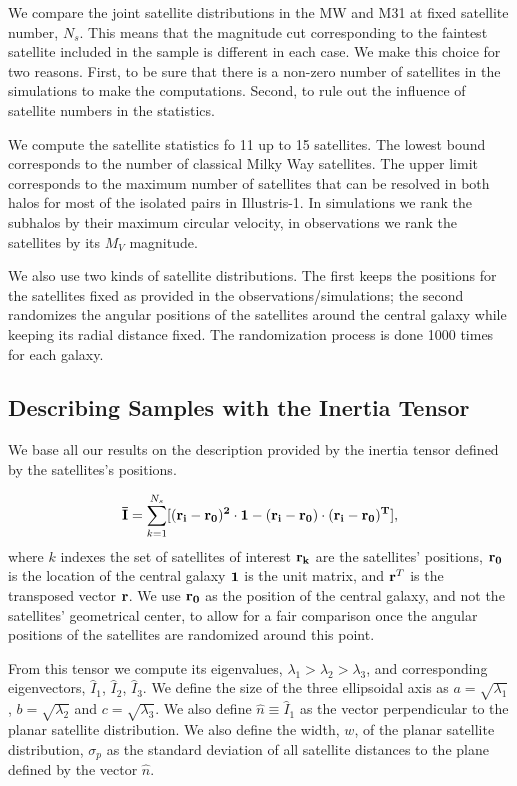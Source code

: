 \documentclass[a4paper,fleqn,usenatbib]{mnras}
\begin{document}
We compare the joint satellite distributions in the MW and M31 at fixed
satellite number, $N_s$.
This means that the magnitude cut corresponding to the faintest
satellite included in the sample is different in each case.
We make this choice for two reasons. 
First, to be sure that there is a non-zero number of satellites in the
simulations to make the computations.  
Second, to rule out the influence of satellite numbers in the
statistics. 

We compute the satellite statistics fo 11 up to 15 satellites.
The lowest bound corresponds to the number of classical Milky Way
satellites.
The upper limit corresponds to the maximum number of satellites that
can be resolved in both halos for most of the isolated pairs in Illustris-1.
In simulations we rank the subhalos by their maximum
circular velocity, in observations we rank the satellites by its $M_V$
magnitude. 

We also use two kinds of satellite distributions. 
The first keeps the positions for the satellites fixed as provided in
the observations/simulations; the second randomizes the angular positions of
the satellites around the central galaxy while keeping its radial
distance fixed. The randomization process is done 1000 times for each
galaxy. 



\subsection{Describing Samples with the Inertia Tensor}
We base all our results on the description provided by the inertia
tensor defined by the satellites's positions.  

\begin{equation}
{\bf{\bar{I}}} = \sum_{k=1}^{N_s}[(\bf{r}_i - \bf{r}_0)^2\cdot \bf{1} -
  (\bf{r}_i-\bf{r}_0)\cdot (\bf{r}_i - \bf{r}_0)^{T}],
\end{equation}
%
where $k$ indexes the set of satellites of interest
$\bf{r}_k$ are the satellites' positions, $\bf{r}_{0}$ is the location
of the central galaxy $\bf{1}$ is the unit matrix,  and  
${\bf r}^T$ is the transposed vector $\bf{r}$. 
We use $\bf{r}_0$ as the position of the central galaxy, and not the
satellites' geometrical center, to allow for a fair comparison once
the angular positions of the satellites are randomized around this
point. 

From this tensor we compute its eigenvalues,
$\lambda_1>\lambda_2>\lambda_3$, and corresponding eigenvectors,
$\hat{I}_1$, $\hat{I}_2$, $\hat{I}_3$.
We define the size of the three ellipsoidal axis as
$a=\sqrt{\lambda_1}$, $b=\sqrt{\lambda_2}$ and $c=\sqrt{\lambda_3}$.
We also define $\hat{n}\equiv \hat{I}_1$ as the vector perpendicular to the
planar satellite distribution. 
We also define the width, $w$, of the planar satellite distribution,
$\sigma_p$ as the standard deviation of all satellite distances to the
plane defined by the vector $\hat{n}$. 
\end{document}
